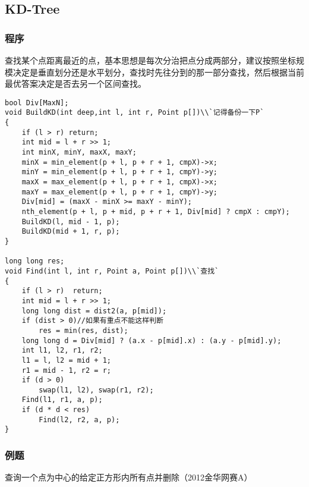 \subsection{KD-Tree}
\subsubsection{程序}
    查找某个点距离最近的点，基本思想是每次分治把点分成两部分，建议按照坐标规模决定是垂直划分还是水平划分，查找时先往分到的那一部分查找，然后根据当前最优答案决定是否去另一个区间查找。

\begin{verbatim}
bool Div[MaxN];
void BuildKD(int deep,int l, int r, Point p[])\\`记得备份一下P`
{
    if (l > r) return;
    int mid = l + r >> 1;
    int minX, minY, maxX, maxY;
    minX = min_element(p + l, p + r + 1, cmpX)->x;
    minY = min_element(p + l, p + r + 1, cmpY)->y;
    maxX = max_element(p + l, p + r + 1, cmpX)->x;
    maxY = max_element(p + l, p + r + 1, cmpY)->y;
    Div[mid] = (maxX - minX >= maxY - minY);
    nth_element(p + l, p + mid, p + r + 1, Div[mid] ? cmpX : cmpY);
    BuildKD(l, mid - 1, p);
    BuildKD(mid + 1, r, p);
}

long long res;
void Find(int l, int r, Point a, Point p[])\\`查找`
{
    if (l > r)  return;
    int mid = l + r >> 1;
    long long dist = dist2(a, p[mid]);
    if (dist > 0)//如果有重点不能这样判断
        res = min(res, dist);
    long long d = Div[mid] ? (a.x - p[mid].x) : (a.y - p[mid].y);
    int l1, l2, r1, r2;
    l1 = l, l2 = mid + 1;
    r1 = mid - 1, r2 = r;
    if (d > 0)
        swap(l1, l2), swap(r1, r2);
    Find(l1, r1, a, p);
    if (d * d < res)
        Find(l2, r2, a, p);
}
\end{verbatim}

\subsubsection{例题}
    查询一个点为中心的给定正方形内所有点并删除（2012金华网赛A）\\

